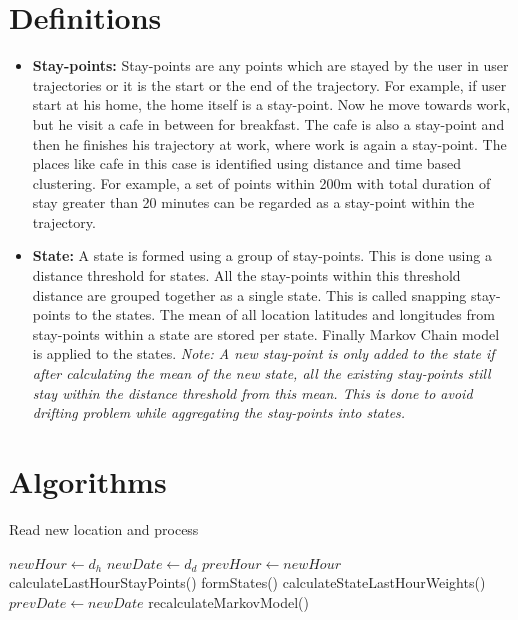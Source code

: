 \documentclass{article}
\begin{document}
\section{Definitions}
\begin{itemize}
	\item \textbf{Stay-points:} Stay-points are any points which are stayed by the user in user trajectories or it is the start or the end of the trajectory. For example, if user start at his home, the home itself is a stay-point. Now he move towards work, but he visit a cafe in between for breakfast. The cafe is also a stay-point and then he finishes his trajectory at work, where work is again a stay-point. The places like cafe in this case is identified using distance and time based clustering. For example, a set of points within 200m with total duration of stay greater than 20 minutes can be regarded as a stay-point within the trajectory.
	\item \textbf{State:} A state is formed using a group of stay-points. This is done using a distance threshold for states. All the stay-points within this threshold distance are grouped together as a single state. This is called snapping stay-points to the states. The mean of all location latitudes and longitudes from stay-points within a state are stored per state. Finally Markov Chain model is applied to the states. \textit{Note: A new stay-point is only added to the state if after calculating the mean of the new state, all the existing stay-points still stay within the distance threshold from this mean. This is done to avoid drifting problem while aggregating the stay-points into states.}
\end{itemize}

\section{Algorithms}

\begin{algorithm}
\caption{Read new location and process}
\label{pseudoPSO}
\begin{algorithmic}[1]
\State $newHour \gets d_h$
\State $newDate \gets d_d$
	\State $prevHour \gets newHour$
	\State calculateLastHourStayPoints()
	\State formStates()
	\State calculateStateLastHourWeights()
		\State $prevDate \gets newDate$
		\State recalculateMarkovModel()
	\EndIf
\EndIf
\EndFor
\end{algorithmic}
\end{algorithm}
\end{document}
